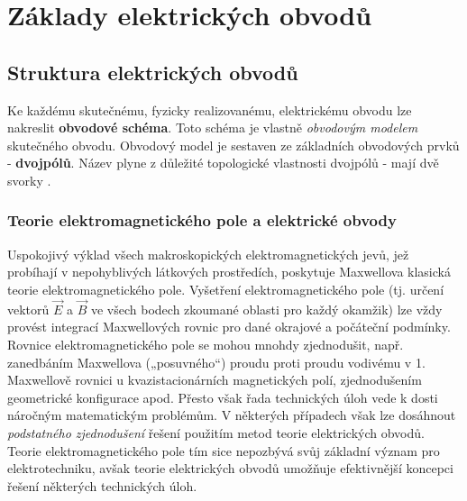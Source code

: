 {
\chapter{Základy elektrických obvodů}
\minitoc

  \section{Struktura elektrických ob\-vo\-dů}
    Ke každému skutečnému, fyzicky realizovanému, elektrickému obvodu lze nakreslit 
    \textbf{obvodové schéma}. Toto schéma je vlastně \emph{obvodovým modelem} skutečného obvodu. 
    Obvodový model je sestaven ze základních obvodových prvků - \textbf{dvojpólů}. Název plyne z 
    důležité topologické vlastnosti dvojpólů - mají dvě svorky \cite[s.~12]{Patocka2}.
    
    \subsection{Teorie elektromagnetického pole a elektrické obvody}
      Uspokojivý výklad všech makroskopických elektromagnetických jevů, jež probíhají v 
      nepohyblivých látkových prostředích, poskytuje Maxwellova klasická teorie elektromagnetického 
      pole. Vyšetření elektromagnetického pole (tj. určení vektorů \(\vec{E}\) a \(\vec{B}\) ve 
      všech bodech zkoumané oblasti pro každý okamžik) lze vždy provést integrací Maxwellových 
      rovnic pro dané okrajové a počáteční podmínky. Rovnice elektromagnetického pole se mohou 
      mnohdy zjednodušit, např. zanedbáním Maxwellova („posuvného“) proudu proti proudu vodivému v 
      1. Maxwellově rovnici u kvazistacionárních magnetických polí, zjednodušením geometrické 
      konfigurace apod. Přesto však řada technických úloh vede k dosti náročným matematickým 
      problémům. V některých případech však lze dosáhnout \emph{podstatného zjednodušení} řešení 
      použitím metod teorie elektrických obvodů. Teorie elektromagnetického pole tím sice nepozbývá 
      svůj základní význam pro elektrotechniku, avšak teorie elektrických obvodů umožňuje 
      efektivnější koncepci řešení některých technických úloh.
      
}
